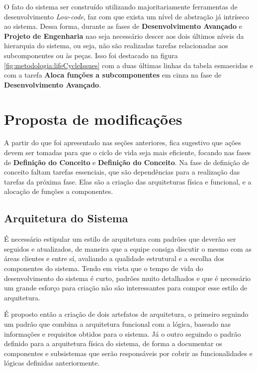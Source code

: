 	O fato do sistema ser construído utilizando majoritariamente ferramentas de desenvolvimento \textit{Low-code}, faz com que exista um nível de abstração já intríseco ao sistema.
	Dessa forma, durante as fases de \textbf{Desenvolvimento Avançado} e \textbf{Projeto de Engenharia} nao seja necessário descer aos dois últimos níveis da hierarquia do sistema, ou seja,
	não são realizadas tarefas relacionadas aos subcomponentes ou às peças. Isso foi destacado na figura \ref{fig:metodologia:lifeCycleIssues} com a duas últimas linhas da tabela esmaecidas
	e com a tarefa \textbf{Aloca funções a subcomponentes} em cinza na fase de \textbf{Desenvolvimento Avançado}.


	\section{{\color{blue}Proposta de modificações}}

	A partir do que foi apresentado nas seções anteriores, fica sugestivo que ações devem ser tomadas para que o ciclo de vida seja mais eficiente, focando nas fases de \textbf{Definição do Conceito} e
	\textbf{Definição do Conceito}.
	Na fase de definição de conceito faltam tarefas essenciais, que são dependências para a realização das tarefas da próxima fase. Elas são a criação das arquiteturas física e funcional, e a alocação de funções a componentes.
	
		
	\subsection{{\color{blue}Arquitetura do Sistema}}

	É necessário estipular um estilo de arquitetura com padrões que deverão ser seguidos e atualizados, de maneira que a equipe consiga 
	discutir o mesmo com as áreas clientes e entre sí, avaliando a qualidade estrutural e a escolha dos componentes do sistema. Tendo em vista que o tempo de vida do desenvolvimento
	do sistema é curto, padrões muito detalhados e que é necessário um grande esforço para criação não são interessantes para compor esse estilo de arquitetura.

	É proposto então a criação de dois artefatos de arquitetura, o primeiro seguindo um padrão que combina a arquitetura funcional com a lógica, baseado nas informações e requisitos obtidos
	para o sistema. Já o outro seguindo o padrão definido para a arquitetura física do sistema, de forma a documentar os componentes e subsistemas que serão responsáveis por cobrir as funcionalidades
	e lógicas definidas anteriormente.
	
